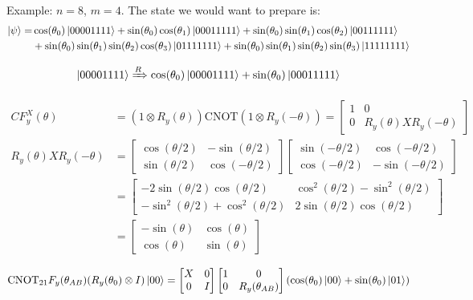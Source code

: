 \documentclass[11pt, oneside]{article}   	%
\begin{document}
Example: $n=8$, $m=4$. The state we would want to prepare is:
\begin{align}
\ket{\psi} 
=&\cos(\theta_0) \ket{00001111} + \sin(\theta_0) \cos(\theta_1) \ket{00011111} + \sin(\theta_0) \sin(\theta_1) \cos(\theta_2) \ket{00111111}  \\
&+ \sin(\theta_0) \sin(\theta_1) \sin(\theta_2) \cos(\theta_{3}) \ket{01111111} + \sin(\theta_0) \sin(\theta_1) \sin(\theta_2) \sin(\theta_3) \ket{11111111} 
\end{align}

\begin{align}
\ket{00001111} \xRightarrow{R} \cos(\theta_0) \ket{00001111} + \sin(\theta_0) \ket{00011111}
\end{align}

\begin{align}
CF^X_y(\theta) &= (1 \otimes R_y(\theta)) \mathrm{CNOT} (1 \otimes R_y(-\theta)) = 
\begin{bmatrix}
1 & 0 \\
0 & R_y(\theta) X R_y(-\theta)
\end{bmatrix} \\
R_y(\theta) X R_y(-\theta) &= 
\begin{bmatrix}
\cos(\theta/2) & -\sin(\theta/2) \\
\sin(\theta/2) & \cos(-\theta/2)
\end{bmatrix} 
\begin{bmatrix}
\sin(-\theta/2) & \cos(-\theta/2) \\
\cos(-\theta/2) & -\sin(-\theta/2)
\end{bmatrix} \\
&=
\begin{bmatrix}
-2 \sin(\theta/2) \cos(\theta/2) & \cos^2(\theta/2) - \sin^2(\theta/2) \\
- \sin^2(\theta/2) + \cos^2(\theta/2) & 2 \sin(\theta/2) \cos(\theta/2)
\end{bmatrix} \\
&=
\begin{bmatrix}
-\sin(\theta) & \cos(\theta) \\
\cos(\theta) & \sin(\theta)
\end{bmatrix}
\end{align}

\begin{align}
\mathrm{CNOT}_{21} F_y(\theta_{AB}) (R_y(\theta_0) \otimes I) \ket{00} 
= 
\begin{bmatrix}
X & 0 \\
0 & I
\end{bmatrix}
\begin{bmatrix}
1 & 0 \\
0 & R_y(\theta_{AB})
\end{bmatrix}
(\cos(\theta_0) \ket{00} + \sin(\theta_0)\ket{01})
\end{align}
\end{document}
